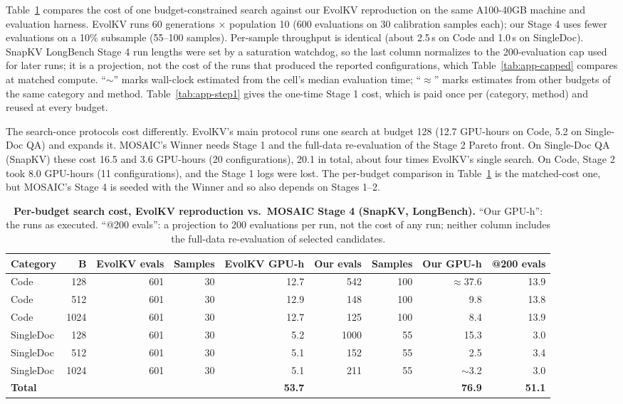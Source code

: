 Table~\ref{tab:app-cost} compares the cost of one budget-constrained search against our EvolKV reproduction on the same A100-40GB machine and evaluation harness. EvolKV runs 60 generations $\times$ population 10 (600 evaluations on 30 calibration samples each); our Stage 4 uses fewer evaluations on a 10\% subsample (55--100 samples). Per-sample throughput is identical (about 2.5\,s on Code and 1.0\,s on SingleDoc). SnapKV LongBench Stage 4 run lengths were set by a saturation watchdog, so the last column normalizes to the 200-evaluation cap used for later runs; it is a projection, not the cost of the runs that produced the reported configurations, which Table~\ref{tab:app-capped} compares at matched compute. ``$\sim$'' marks wall-clock estimated from the cell's median evaluation time; ``$\approx$'' marks estimates from other budgets of the same category and method. Table~\ref{tab:app-step1} gives the one-time Stage 1 cost, which is paid once per (category, method) and reused at every budget.

The search-once protocols cost differently. EvolKV's main protocol runs one search at budget 128 (12.7 GPU-hours on Code, 5.2 on Single-Doc QA) and expands it. MOSAIC's Winner needs Stage 1 and the full-data re-evaluation of the Stage 2 Pareto front. On Single-Doc QA (SnapKV) these cost 16.5 and 3.6 GPU-hours (20 configurations), 20.1 in total, about four times EvolKV's single search. On Code, Stage 2 took 8.0 GPU-hours (11 configurations), and the Stage 1 logs were lost. The per-budget comparison in Table~\ref{tab:app-cost} is the matched-cost one, but MOSAIC's Stage 4 is seeded with the Winner and so also depends on Stages 1--2.

\begin{table}[t]
  \centering
  \footnotesize
  \setlength{\tabcolsep}{3pt}
  \begin{tabular}{@{}l r r r r r r r r@{}}
    \toprule
    Category & B & EvolKV evals & Samples & EvolKV GPU-h & Our evals & Samples & Our GPU-h & @200 evals \\
    \midrule
    Code & 128 & 601 & 30 & 12.7 & 542 & 100 & $\approx$37.6 & 13.9 \\
    Code & 512 & 601 & 30 & 12.9 & 148 & 100 & 9.8 & 13.8 \\
    Code & 1024 & 601 & 30 & 12.7 & 125 & 100 & 8.4 & 13.9 \\
    SingleDoc & 128 & 601 & 30 & 5.2 & 1000 & 55 & 15.3 & 3.0 \\
    SingleDoc & 512 & 601 & 30 & 5.1 & 152 & 55 & 2.5 & 3.4 \\
    SingleDoc & 1024 & 601 & 30 & 5.1 & 211 & 55 & $\sim$3.2 & 3.0 \\
    \textbf{Total} &  &  &  & \textbf{53.7} &  &  & \textbf{76.9} & \textbf{51.1} \\
    \bottomrule
  \end{tabular}
  \caption{\textbf{Per-budget search cost, EvolKV reproduction vs.\ MOSAIC Stage 4 (SnapKV, LongBench).} ``Our GPU-h'': the runs as executed. ``@200 evals'': a projection to 200 evaluations per run, not the cost of any run; neither column includes the full-data re-evaluation of selected candidates.}
  \label{tab:app-cost}
\end{table}


